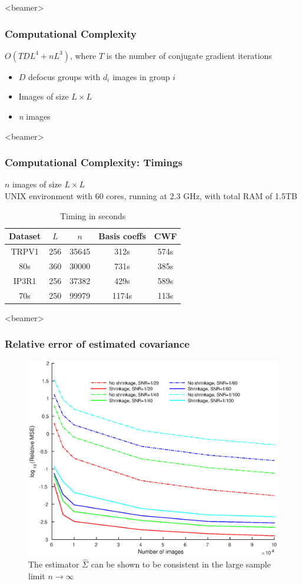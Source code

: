 \documentclass{beamer}
\begin{document}
\begin{frame}<beamer>
\frametitle{Computational Complexity}
$O(TDL^4 + nL^3)$, where $T$ is the number of conjugate gradient iterations
\begin{itemize}
\item $D$ defocus groups with $d_i$ images in group $i$
\item Images of size $L \times L$
\item \textit{n} images
\end{itemize}
\end{frame}


\begin{frame}<beamer>
\frametitle{Computational Complexity: Timings}
$n$ images of size $L \times L$\\
UNIX environment with 60 cores,
running at 2.3 GHz, with total RAM of 1.5TB


\begin{table}[t]
  \centering
  \caption{Timing in seconds}
  \begin{tabular}{ccccc}
    \toprule
    Dataset & $L$ & $n$ & Basis coeffs  & CWF \\
    \midrule
    TRPV1 & 256 & 35645 & 312s & 574s \\
    80s & 360 & 30000 &  731s & 385s \\
    IP3R1  & 256 & 37382 & 429s & 589s\\
    70s & 250 &  99979 & 1174s & 113s \\
 \bottomrule
  \end{tabular}
\end{table}
\end{frame}



\begin{frame}<beamer>
\frametitle{Relative error of estimated covariance}
\begin{figure}
\centering
\includegraphics[width=0.6\linewidth]{figures/cwf_shrinkage_compare.eps}
\caption{The estimator $\hat \Sigma$ can be shown to be consistent in the large sample limit
$n \to \infty$}
\label{fig:shrinkage}
\end{figure}
\end{frame}
\end{document}
